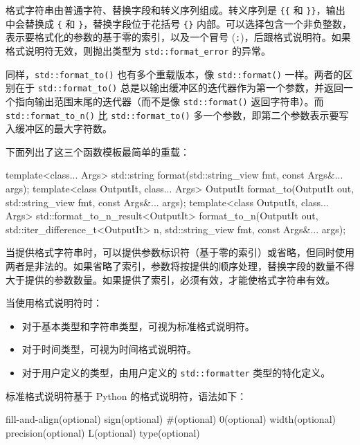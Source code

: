 格式字符串由普通字符、替换字段和转义序列组成。转义序列是 \verb|{{| 和 \verb|}}|，输出中会替换成 \verb|{| 和 \verb|}|，替换字段位于花括号 \verb|{}| 内部。可以选择包含一个非负整数，表示要格式化的参数的基于零的索引，以及一个冒号 (\verb|:|)，后跟格式说明符。如果格式说明符无效，则抛出类型为 \verb|std::format_error| 的异常。

同样，\verb|std::format_to()| 也有多个重载版本，像 \verb|std::format()| 一样。两者的区别在于 \verb|std::format_to()| 总是以输出缓冲区的迭代器作为第一个参数，并返回一个指向输出范围末尾的迭代器（而不是像 \verb|std::format()| 返回字符串）。而 \verb|std::format_to_n()| 比 \verb|std::format_to()| 多一个参数，即第二个参数表示要写入缓冲区的最大字符数。

下面列出了这三个函数模板最简单的重载：

\begin{cpp}
template<class... Args>
std::string format(std::string_view fmt, const Args&... args);
template<class OutputIt, class... Args>
OutputIt format_to(OutputIt out,
                   std::string_view fmt, const Args&... args);
template<class OutputIt, class... Args>
std::format_to_n_result<OutputIt>
format_to_n(OutputIt out, std::iter_difference_t<OutputIt> n,
            std::string_view fmt, const Args&... args);
\end{cpp}

当提供格式字符串时，可以提供参数标识符（基于零的索引）或省略，但同时使用两者是非法的。如果省略了索引，参数将按提供的顺序处理，替换字段的数量不得大于提供的参数数量。如果提供了索引，必须有效，才能使格式字符串有效。

当使用格式说明符时：

\begin{itemize}
\item
对于基本类型和字符串类型，可视为标准格式说明符。

\item
对于时间类型，可视为时间格式说明符。

\item
对于用户定义的类型，由用户定义的 \verb|std::formatter| 类型的特化定义。
\end{itemize}

标准格式说明符基于 Python 的格式说明符，语法如下：

\begin{shell}
fill-and-align(optional) sign(optional) #(optional) 0(optional) width(optional) precision(optional) L(optional) type(optional)
\end{shell}

